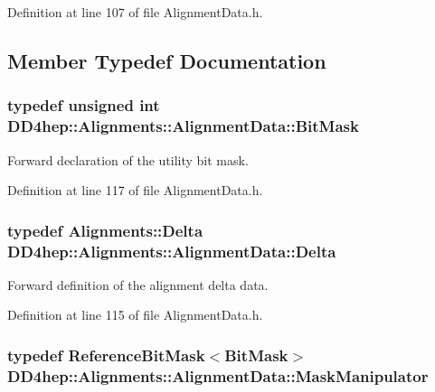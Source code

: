 Definition at line 107 of file AlignmentData.h.

\subsection{Member Typedef Documentation}
\hypertarget{class_d_d4hep_1_1_alignments_1_1_alignment_data_ab5c31f7e5512ca675be8323bc723b123}{
\subsubsection[{BitMask}]{\setlength{\rightskip}{0pt plus 5cm}typedef unsigned int {\bf DD4hep::Alignments::AlignmentData::BitMask}}}
\label{class_d_d4hep_1_1_alignments_1_1_alignment_data_ab5c31f7e5512ca675be8323bc723b123}


Forward declaration of the utility bit mask. 

Definition at line 117 of file AlignmentData.h.\hypertarget{class_d_d4hep_1_1_alignments_1_1_alignment_data_a3e67a5cbb3449006e9552b0f7bd98d45}{
\subsubsection[{Delta}]{\setlength{\rightskip}{0pt plus 5cm}typedef {\bf Alignments::Delta} {\bf DD4hep::Alignments::AlignmentData::Delta}}}
\label{class_d_d4hep_1_1_alignments_1_1_alignment_data_a3e67a5cbb3449006e9552b0f7bd98d45}


Forward definition of the alignment delta data. 

Definition at line 115 of file AlignmentData.h.\hypertarget{class_d_d4hep_1_1_alignments_1_1_alignment_data_a7eb85e9201294a4ae7a3c5fe6d913233}{
\subsubsection[{MaskManipulator}]{\setlength{\rightskip}{0pt plus 5cm}typedef {\bf ReferenceBitMask}$<${\bf BitMask}$>$ {\bf DD4hep::Alignments::AlignmentData::MaskManipulator}}}
\label{class_d_d4hep_1_1_alignments_1_1_alignment_data_a7eb85e9201294a4ae7a3c5fe6d913233}


